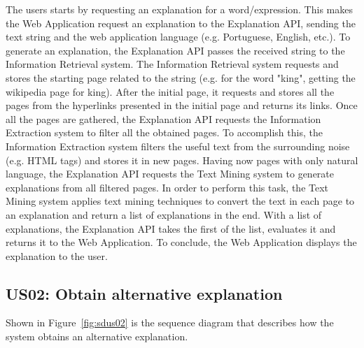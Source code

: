 The users starts by requesting an explanation for a word/expression.
This makes the Web Application request an explanation to the Explanation API, sending the text string and the web application language (e.g. Portuguese, English, etc.).
To generate an explanation, the Explanation API passes the received string to the Information Retrieval system.
The Information Retrieval system requests and stores the starting page related to the string (e.g. for the word "king", getting the wikipedia page for king).
After the initial page, it requests and stores all the pages from the hyperlinks presented in the initial page and returns its links.
Once all the pages are gathered, the Explanation API requests the Information Extraction system to filter all the obtained pages.
To accomplish this, the Information Extraction system filters the useful text from the surrounding noise (e.g. HTML tags) and stores it in new pages.
Having now pages with only natural language, the Explanation API requests the Text Mining system to generate explanations from all filtered pages.
In order to perform this task, the Text Mining system applies text mining techniques to convert the text in each page to an explanation and return a list of explanations in the end.
With a list of explanations, the Explanation API takes the first of the list, evaluates it and returns it to the Web Application.
To conclude, the Web Application displays the explanation to the user.

\subsection{US02: Obtain alternative explanation}

Shown in Figure~\ref{fig:sdus02} is the sequence diagram that describes how the system obtains an alternative explanation.

